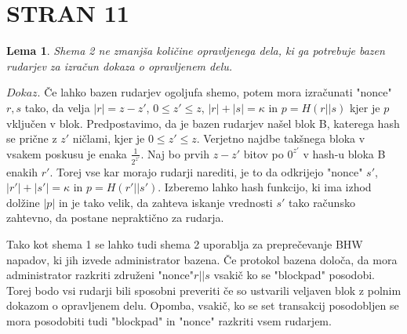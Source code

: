 \documentclass[12pt]{article}
\newtheorem{lema}{Lema}
\begin{document}
\section{STRAN 11}

\begin{lema}\label{lema6}
	Shema 2 ne zmanjša količine opravljenega dela, ki ga potrebuje bazen rudarjev za izračun dokaza o opravljenem delu.
\end{lema}

\noindent\textit{$Dokaz$}. Če lahko bazen rudarjev ogoljufa shemo, potem mora izračunati "nonce"\textit{$r,s$} tako, da velja \textit{$|r| = z - z'$}, \textit{$0 \leq z' \leq z$}, \textit{$|r| + |s| = \kappa$} in \textit{$p = H(r||s)$} kjer je \textit{$p$} vključen v blok. Predpostavimo, da je bazen rudarjev našel blok B, katerega hash se prične z \textit{$z'$} ničlami, kjer je \textit{$0 \leq z' \leq z$}. Verjetno najdbe takšnega bloka v vsakem poskusu je enaka $\frac{1}{2^{z'}}$. Naj bo prvih \textit{$z - z'$} bitov po \textit{$0^{z'}$} v hash-u bloka B enakih \textit{$r'$}. Torej vse kar morajo rudarji narediti, je to da odkrijejo "nonce" \textit{$s'$}, \textit{$|r'| + |s'| = \kappa$} in \textit{$p = H(r'||s')$}. Izberemo lahko hash funkcijo, ki ima izhod dolžine \textit{$|p|$} in je tako velik, da zahteva iskanje vrednosti \textit{$s'$} tako računsko zahtevno, da postane nepraktično za rudarja.

Tako kot shema 1 se lahko tudi shema 2 uporablja za preprečevanje BHW napadov, ki jih izvede administrator bazena. Če protokol bazena določa, da mora administrator razkriti združeni "nonce"\textit{$r||s$} vsakič ko se "blockpad" posodobi. Torej bodo vsi rudarji bili sposobni preveriti če so ustvarili veljaven blok z polnim dokazom o opravljenem delu. Opomba, vsakič, ko se set transakcij posodobljen se mora posodobiti tudi "blockpad" in "nonce" razkriti vsem rudarjem.
\end{document}
